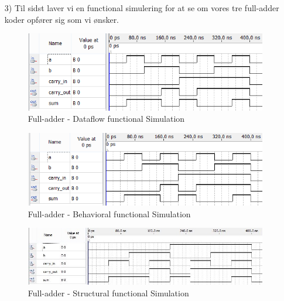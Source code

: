 \begin{enumerate}
	\newpage
	\flushleft
		\item[3)]
		Til sidst laver vi en functional simulering for at se om vores tre full-adder koder opfører sig som vi ønsker.\\	

	\begin{figure}[h]
		\centering
		\includegraphics[scale=0.8]{pictures/Oevelse1/Full_adder/Dataflow_functional_simulation.jpg}
		\caption{Full-adder - Dataflow functional Simulation}
		\label{fig:FaDataflowFunctionalSim}
	\end{figure}
	\begin{figure}[h]
		\centering
		\includegraphics[scale=0.8]{pictures/Oevelse1/Full_adder/Behavioral_functional_simulation.jpg}
		\caption{Full-adder - Behavioral functional Simulation}
		\label{fig:FaBehavioralFunctionalSim}
	\end{figure}
	\begin{figure}[h]
		\centering
		\includegraphics[scale=0.6]{pictures/Oevelse1/Full_adder/Structural_functional_simulation.jpg}
		\caption{Full-adder - Structural functional Simulation}
		\label{fig:FaStructuralFunctionalSim}
	\end{figure}
	\newpage

\end{enumerate}

